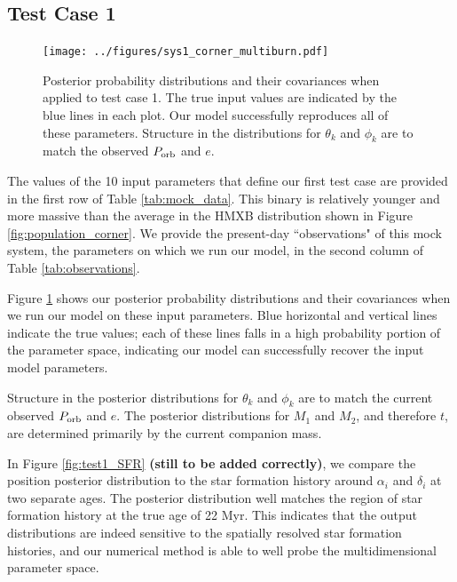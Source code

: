\documentclass[12pt, preprint]{aastex}
\begin{document}
\subsection{Test Case 1}


\begin{figure}[h!]
\begin{center}
\texttt{[image: ../figures/sys1\_corner\_multiburn.pdf]}
\caption{Posterior probability distributions and their covariances when applied to test case 1. The true input values are indicated by the blue lines in each plot. Our model successfully reproduces all of these parameters. Structure in the distributions for $\theta_k$ and $\phi_k$ are to match the observed $P_{\rm orb}$ and $e$. }
\label{fig:test1_corner}
\end{center}
\end{figure}

The values of the 10 input parameters that define our first test case are provided in the first row of Table \ref{tab:mock_data}. This binary is relatively younger and more massive than the average in the HMXB distribution shown in Figure \ref{fig:population_corner}. We provide the present-day ``observations" of this mock system, the parameters on which we run our model, in the second column of Table \ref{tab:observations}.

Figure \ref{fig:test1_corner} shows our posterior probability distributions and their covariances when we run our model on these input parameters. Blue horizontal and vertical lines indicate the true values; each of these lines falls in a high probability portion of the parameter space, indicating our model can successfully recover the input model parameters.

Structure in the posterior distributions for $\theta_k$ and $\phi_k$ are to match the current observed $P_{\rm orb}$ and $e$. The posterior distributions for $M_1$ and $M_2$, and therefore $t$, are determined primarily by the current companion mass.

In Figure \ref{fig:test1_SFR} {\bf (still to be added correctly)}, we compare the position posterior distribution to the star formation history around $\alpha_i$ and $\delta_i$ at two separate ages. The posterior distribution well matches the region of star formation history at the true age of 22 Myr. This indicates that the output distributions are indeed sensitive to the spatially resolved star formation histories, and our numerical method is able to well probe the multidimensional parameter space.
\end{document}
